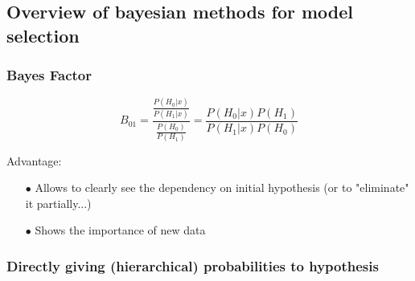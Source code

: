 \documentclass{beamer}
\begin{document}
\begin{frame}
\section{Overview of bayesian methods for model selection}
\frametitle{Bayes Factor}

\begin{equation}
B_{01} = \displaystyle{\frac{\displaystyle{\frac{P(H_0|x)}{P(H_1|x)}}}{\displaystyle{\frac{P(H_0)}{P(H_1)}}}} = \displaystyle{\frac{P(H_0|x)P(H_1)}{P(H_1|x)P(H_0)}}
\end{equation}

Advantage: 
\begin{itemize}
\item[$\bullet$] Allows to clearly see the dependency on initial hypothesis (or to "eliminate" it partially...)
\item[$\bullet$] Shows the importance of new data
\end{itemize}

\end{frame}

\begin{frame}
\frametitle{Directly giving (hierarchical) probabilities to hypothesis}


\end{frame}


\begin{frame}

\end{frame}
\end{document}
